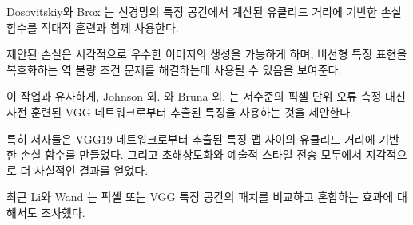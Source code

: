 \documentclass[10pt,twocolumn,letterpaper]{article}
\newcommand{\kor}[1]{#1}
\newcommand{\eng}[1]{}
\newcommand{\summary}[1]{}
\begin{document}
\eng{
Dosovitskiy and Brox \cite{dosovitskiy2016generating} use loss functions based on Euclidean distances computed in the feature space of neural networks in combination with adversarial training.
}\kor{
Dosovitskiy와 Brox \cite{dosovitskiy2016generating}는 신경망의 특징 공간에서 계산된 유클리드 거리에 기반한 손실 함수를 적대적 훈련과 함께 사용한다.
} \eng{
It is shown that the proposed loss allows visually superior image generation and can be used to solve the ill-posed inverse problem of decoding nonlinear feature representations.
}\kor{
제안된 손실은 시각적으로 우수한 이미지의 생성을 가능하게 하며, 비선형 특징 표현을 복호화하는 역 불량 조건 문제를 해결하는데 사용될 수 있음을 보여준다.
}
\eng{
Similar to this work, Johnson et al. \cite{Johnson16PercepLoss} and Bruna et al. \cite{bruna2016super} propose the use of features extracted from a pre-trained VGG network instead of low-level pixel-wise error measures.
}\kor{
이 작업과 유사하게, Johnson 외. \cite{Johnson16PercepLoss}와 Bruna 외. \cite{bruna2016super}는 저수준의 픽셀 단위 오류 측정 대신 사전 훈련된 VGG 네트워크로부터 추출된 특징을 사용하는 것을 제안한다.
} \eng{
Specifically the authors formulate a loss function based on the euclidean distance between feature maps extracted from the VGG19 \cite{simonyan2014very} network. Perceptually more convincing results were obtained for both super-resolution and artistic style-transfer \cite{Gatys2015nips,Gatys2016cvpr}.
}\kor{
특히 저자들은 VGG19 \cite{simonyan2014very} 네트워크로부터 추출된 특징 맵 사이의 유클리드 거리에 기반한 손실 함수를 만들었다. 그리고 초해상도화와 예술적 스타일 전송 \cite{Gatys2015nips,Gatys2016cvpr} 모두에서 지각적으로 더 사실적인 결과를 얻었다.
} \eng{
Recently, Li and Wand \cite{Li2016} also investigated the effect of comparing and blending patches in pixel or VGG feature space.
}\kor{
최근 Li와 Wand \cite{Li2016}는 픽셀 또는 VGG 특징 공간의 패치를 비교하고 혼합하는 효과에 대해서도 조사했다.
}

\summary{
특징 공간의 유클리드 거리에 기반한 손실 함수와 VGG19 네트워크에서 추출된 특징을 사용하는 초해상도화 및 스타일 전송에 대한 연구 소개
}
\end{document}

